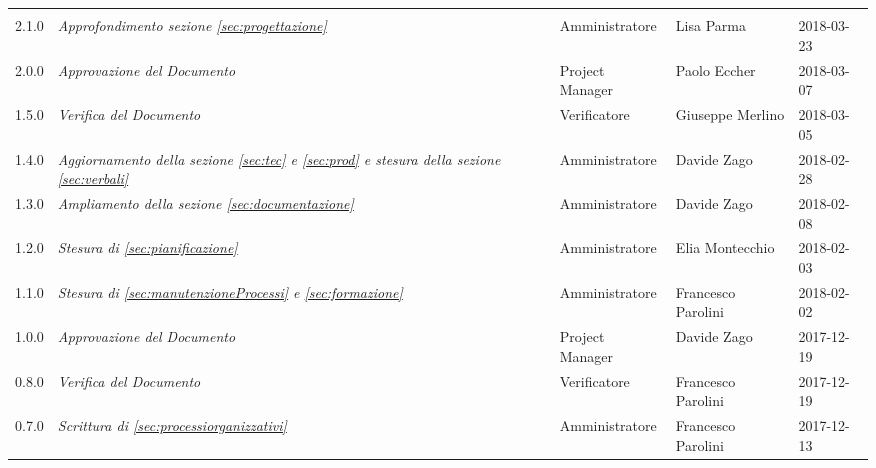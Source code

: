 \newpage 
\section*{}
\begin{table}[H]
	\centering
	\begin{tabular}{p{2cm}|C{4cm}|C{3cm}|C{3cm}|R{2cm}}

		
		
			 &  & &  & \\
		
		2.1.0  & \emph{Approfondimento sezione \ref{sec:progettazione}} & Amministratore & Lisa Parma &  2018-03-23 \\
		\hline
		
		2.0.0  & \emph{Approvazione del Documento} & Project Manager & Paolo Eccher&  2018-03-07 \\
		\hline
		
		1.5.0  &  \emph{Verifica del Documento} & Verificatore & Giuseppe Merlino & 2018-03-05 \\
		\hline
		
		1.4.0  & \emph{Aggiornamento della sezione \ref{sec:tec} e \ref{sec:prod} e stesura della sezione \ref{sec:verbali}} &  Amministratore & Davide Zago & 2018-02-28  \\
		\hline
		
		1.3.0  & \emph{Ampliamento della sezione \ref{sec:documentazione}} &  Amministratore & Davide Zago & 2018-02-08  \\
		\hline
		
		1.2.0  & \emph{Stesura di \ref{sec:pianificazione}} &  Amministratore & Elia Montecchio & 2018-02-03  \\
		\hline
		
		1.1.0  & \emph{Stesura di \ref{sec:manutenzioneProcessi} e \ref{sec:formazione}} &  Amministratore & Francesco Parolini & 2018-02-02  \\
		\hline
		
		1.0.0  & \emph{Approvazione del Documento} & Project Manager & Davide Zago &  2017-12-19 \\
		\hline
		
		0.8.0  &  \emph{Verifica del Documento} & Verificatore & Francesco Parolini & 2017-12-19 \\
		\hline
		
		0.7.0  & \emph{Scrittura di \ref{sec:processiorganizzativi}}  & Amministratore & Francesco Parolini & 2017-12-13\\
		\hline
		

\end{tabular}
\end{table}
